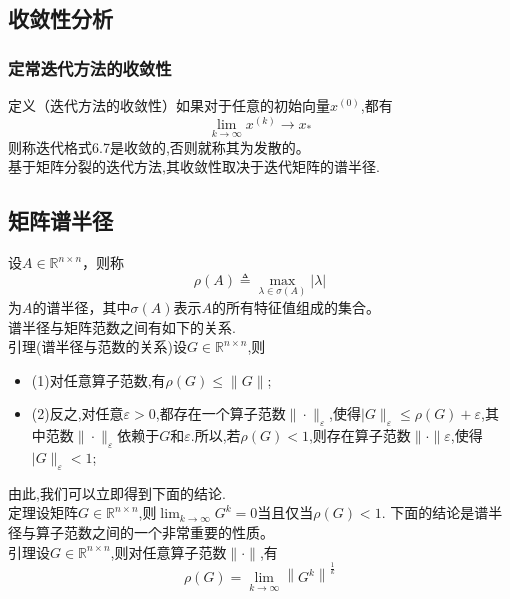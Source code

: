 \documentclass[12pt,a4paper]{article}
\begin{document}
\subsection{收敛性分析}
\subsubsection{定常迭代方法的收敛性}
{\color{blue}定义（迭代方法的收敛性）}如果对于任意的初始向量$x^{(0)}$,都有
$$\lim_{k\to \infty}x^{(k)}\to x_*$$
则称迭代格式{\color{blue}6.7}是{\color{blue}收敛}的,否则就称其为{\color{blue}发散}的。\\
基于矩阵分裂的迭代方法,其收敛性取决于迭代矩阵的谱半径.
\subsection*{矩阵谱半径}
设$A \in \mathbb{R}^{n \times n}$，则称
$$
\rho(A) \triangleq \max _{\lambda \in \sigma(A)}|\lambda|
$$
为$A$的{\color{blue}谱半径}，其中$\sigma(A)$表示$A$的所有特征值组成的集合。\\
谱半径与矩阵范数之间有如下的关系.\\
{\color{blue}引理(谱半径与范数的关系)}设$G \in \mathbb{R}^{n \times n}$,则
\begin{itemize}
\item (1)对任意算子范数,有$\rho(G) \leq\|G\|$;
\item (2)反之,对任意$\varepsilon>0$,都存在一个算子范数$\|\cdot\|_{\varepsilon}$,使得$| G \|_{\varepsilon} \leq\rho(G)+\varepsilon$,其中范数$\|\cdot\|_{\varepsilon}$依赖于$G$和$\varepsilon$.所以,若$\rho(G)<1$,则存在算子范数$\|\cdot\| \varepsilon$,使得$| G \|_{\varepsilon}<1$;
\end{itemize}
由此,我们可以立即得到下面的结论.\\
{\color{blue}定理}设矩阵$G \in \mathbb{R}^{n \times n}$,则$\lim _{k \rightarrow \infty} G^{k}=0$当且仅当$\rho(G)<1$.
下面的结论是谱半径与算子范数之间的一个非常重要的性质。\\
{\color{blue}引理}设$G \in \mathbb{R}^{n \times n}$,则对任意算子范数$\|\cdot\|$,有
$$
\rho(G)=\lim _{k \rightarrow \infty}\left\|G^{k}\right\|^{\frac{1}{k}}
$$
\end{document}
